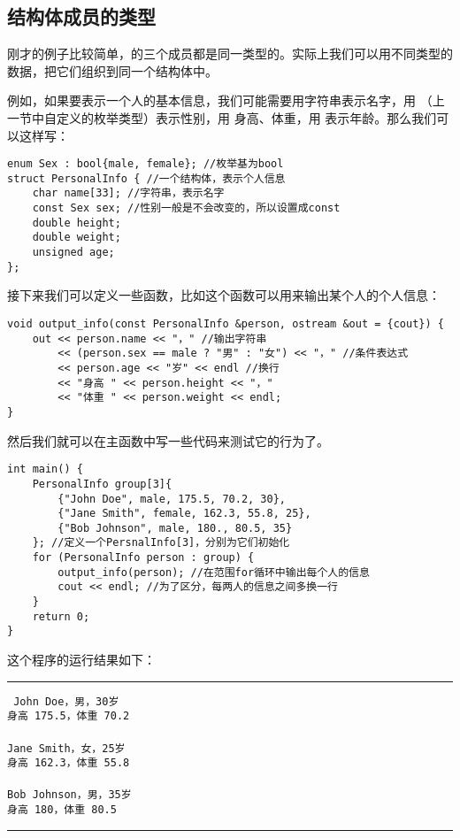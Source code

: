 \subsection*{结构体成员的类型}
刚才的例子比较简单，\lstinline@Cuboid@ 的三个成员都是同一类型的。实际上我们可以用不同类型的数据，把它们组织到同一个结构体中。\par
例如，如果要表示一个人的基本信息，我们可能需要用字符串表示名字，用 \lstinline@Sex@（上一节中自定义的枚举类型）表示性别，用 \lstinline@double@ 身高、体重，用 \lstinline@unsigned@ 表示年龄。那么我们可以这样写：
\begin{lstlisting}
enum Sex : bool{male, female}; //枚举基为bool
struct PersonalInfo { //一个结构体，表示个人信息
    char name[33]; //字符串，表示名字
    const Sex sex; //性别一般是不会改变的，所以设置成const
    double height;
    double weight;
    unsigned age;
};
\end{lstlisting}
接下来我们可以定义一些函数，比如这个函数可以用来输出某个人的个人信息：
\begin{lstlisting}
void output_info(const PersonalInfo &person, ostream &out = {cout}) {
    out << person.name << "，" //输出字符串
        << (person.sex == male ? "男" : "女") << "，" //条件表达式
        << person.age << "岁" << endl //换行
        << "身高 " << person.height << "，"
        << "体重 " << person.weight << endl;
}
\end{lstlisting}
然后我们就可以在主函数中写一些代码来测试它的行为了。
\begin{lstlisting}
int main() {
    PersonalInfo group[3]{
        {"John Doe", male, 175.5, 70.2, 30},
        {"Jane Smith", female, 162.3, 55.8, 25},
        {"Bob Johnson", male, 180., 80.5, 35}
    }; //定义一个PersnalInfo[3]，分别为它们初始化
    for (PersonalInfo person : group) {
        output_info(person); //在范围for循环中输出每个人的信息
        cout << endl; //为了区分，每两人的信息之间多换一行
    }
    return 0;
}
\end{lstlisting}
这个程序的运行结果如下：\\\noindent\rule{\linewidth}{.2pt}\texttt{
John Doe，男，30岁\\
身高 175.5，体重 70.2\\
\\
Jane Smith，女，25岁\\
身高 162.3，体重 55.8\\
\\
Bob Johnson，男，35岁\\
身高 180，体重 80.5
}\\\noindent\rule{\linewidth}{.2pt}\par

